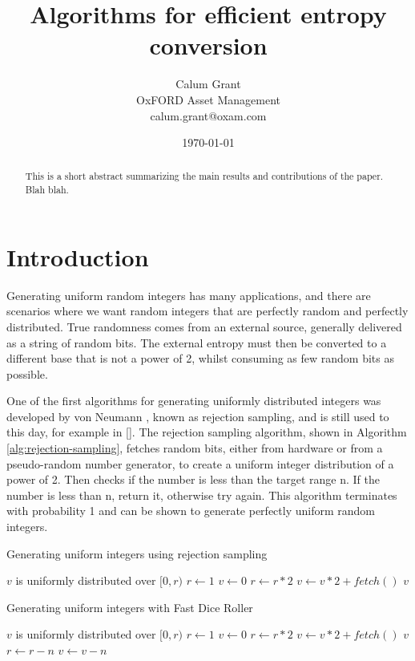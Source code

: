 \documentclass[12pt]{article}
\title{Algorithms for efficient entropy conversion}
\author{Calum Grant \\
OxFORD Asset Management \\
calum.grant@oxam.com}
\date{\today}
\begin{document}
\maketitle

\begin{abstract}
This is a short abstract summarizing the main results and contributions of the paper. Blah blah.
\end{abstract}

\section{Introduction}

Generating uniform random integers has many applications, and there are scenarios where we want random integers that are perfectly random and perfectly distributed. True randomness comes from an external source, generally delivered as a string of random bits. The external entropy must then be converted to a different base that is not a power of 2, whilst consuming as few random bits as possible.

One of the first algorithms for generating uniformly distributed integers was developed by von Neumann \cite{neumann}, known as rejection sampling, and is still used to this day, for example in []. The rejection sampling algorithm, shown in Algorithm \ref{alg:rejection-sampling}, fetches random bits, either from hardware or from a pseudo-random number generator, to create a uniform integer distribution of a power of 2. Then checks if the number is less than the target range n. If the number is less than n, return it, otherwise try again. This algorithm terminates with probability 1 and can be shown to generate perfectly uniform random integers.

\begin{algorithm}
\caption{Generating uniform integers using rejection sampling}
\begin{algorithmic}[1]
    \label{alg:rejection-sampling}
    \Ensure $v$ is uniformly distributed over $[0,r)$
        \State $r \gets 1$
        \State $v \gets 0$
            \State $r \gets r * 2$
            \State $v \gets v * 2 + fetch()$
        \EndWhile
            \State \Return $v$
        \EndIf
    \EndWhile
\EndProcedure
\end{algorithmic}
\end{algorithm}

\begin{algorithm}
\caption{Generating uniform integers with Fast Dice Roller}
\begin{algorithmic}[1]
    \label{alg:fast-dice-roller}
    \Ensure $v$ is uniformly distributed over $[0,r)$
    \State $r \gets 1$
    \State $v \gets 0$
    \Loop
            \State $r \gets r * 2$
            \State $v \gets v * 2 + fetch()$
        \EndWhile
            \State \Return $v$
        \EndIf
        \State $r \gets r-n$
        \State $v \gets v-n$
    \EndLoop
\EndProcedure
\end{algorithmic}
\end{algorithm}
\end{document}
